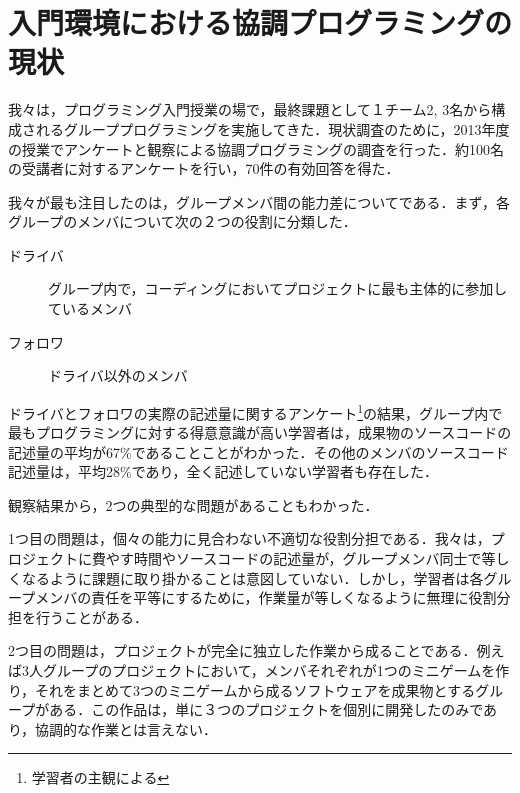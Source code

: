 \section{入門環境における協調プログラミングの現状}\label{State}

我々は，プログラミング入門授業の場で，最終課題として１チーム2, 3名から構成されるグループプログラミングを実施してきた．現状調査のために，2013年度の授業でアンケートと観察による協調プログラミングの調査を行った．約100名の受講者に対するアンケートを行い，70件の有効回答を得た．

我々が最も注目したのは，グループメンバ間の能力差についてである．まず，各グループのメンバについて次の２つの役割に分類した．

\begin{description}
	\item[ドライバ] グループ内で，コーディングにおいてプロジェクトに最も主体的に参加しているメンバ
	\item[フォロワ] ドライバ以外のメンバ
\end{description}

ドライバとフォロワの実際の記述量に関するアンケート\footnote{学習者の主観による}の結果，グループ内で最もプログラミングに対する得意意識が高い学習者は，成果物のソースコードの記述量の平均が67\%であることことがわかった．その他のメンバのソースコード記述量は，平均28\%であり，全く記述していない学習者も存在した．


観察結果から，2つの典型的な問題があることもわかった．

1つ目の問題は，個々の能力に見合わない不適切な役割分担である．我々は，プロジェクトに費やす時間やソースコードの記述量が，グループメンバ同士で等しくなるように課題に取り掛かることは意図していない．しかし，学習者は各グループメンバの責任を平等にするために，作業量が等しくなるように無理に役割分担を行うことがある．

2つ目の問題は，プロジェクトが完全に独立した作業から成ることである．例えば3人グループのプロジェクトにおいて，メンバそれぞれが1つのミニゲームを作り，それをまとめて3つのミニゲームから成るソフトウェアを成果物とするグループがある．この作品は，単に３つのプロジェクトを個別に開発したのみであり，協調的な作業とは言えない．


